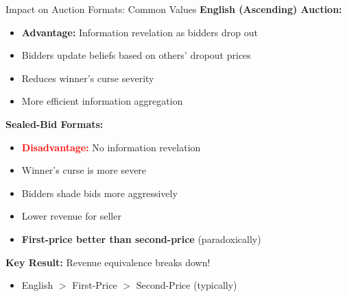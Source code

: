 \documentclass[xcolor={x11names}]{beamer}
\begin{document}
\begin{frame}{Impact on Auction Formats: Common Values}
\textbf{English (Ascending) Auction:}
\begin{itemize}
  \item \textcolor{green!70!black}{\textbf{Advantage:}} Information revelation as bidders drop out
  \item Bidders update beliefs based on others' dropout prices
  \item Reduces winner's curse severity
  \item More efficient information aggregation
\end{itemize}


\textbf{Sealed-Bid Formats:}
\begin{itemize}
  \item \textcolor{red}{\textbf{Disadvantage:}} No information revelation
  \item Winner's curse is more severe
  \item Bidders shade bids more aggressively
  \item Lower revenue for seller
  \item \textbf{First-price better than second-price} (paradoxically)
\end{itemize}


\textbf{Key Result:} Revenue equivalence breaks down!
\begin{itemize}
  \item English $>$ First-Price $>$ Second-Price (typically)
\end{itemize}
\end{frame}
\end{document}
